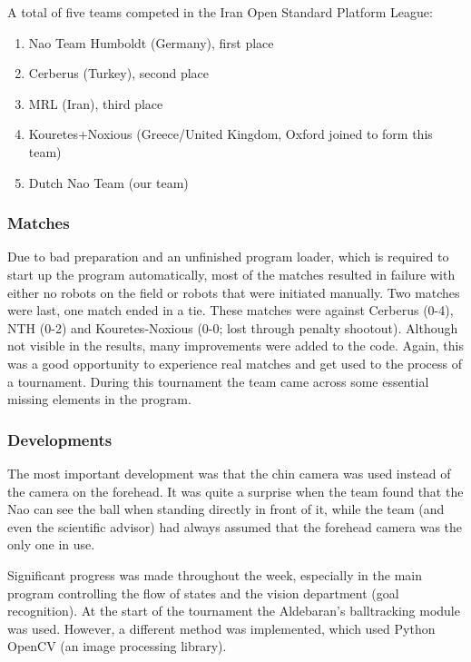 \documentclass[11pt,a4paper,oneside]{article}
\begin{document}
A total of five teams competed in the Iran Open Standard Platform League:
\begin{enumerate}
\item Nao Team Humboldt (Germany), first place
\item Cerberus (Turkey), second place
\item MRL (Iran), third place
\item Kouretes+Noxious (Greece/United Kingdom, Oxford joined to form this team)
\item Dutch Nao Team (our team)
\end{enumerate}

\subsubsection{Matches}
Due to bad preparation and an unfinished program loader, which is required to start up the program automatically, most of the matches resulted in failure with either no robots on the field or robots that were initiated manually.
 Two matches were last, one match ended in a tie. These matches were against Cerberus (0-4), NTH (0-2) and Kouretes-Noxious (0-0; lost through penalty shootout). Although not visible in the results, many improvements were added to the code.
Again, this was a good opportunity to experience real matches and get used to the process of a tournament. During this tournament the team came across some essential missing elements in the program.

\subsubsection{Developments}
The most important development was that the chin camera was used instead of the camera on the forehead. It was quite a surprise when the team found that the Nao can see the ball when standing directly in front of it, while the team (and even the scientific advisor) had always assumed that the forehead camera was the only one in use.

Significant progress was made throughout the week, especially in the main program controlling the flow of states and the vision department (goal recognition). At the start of the tournament the Aldebaran's balltracking module was used. However, a different method was implemented, which used Python OpenCV (an image processing library).
\end{document}
